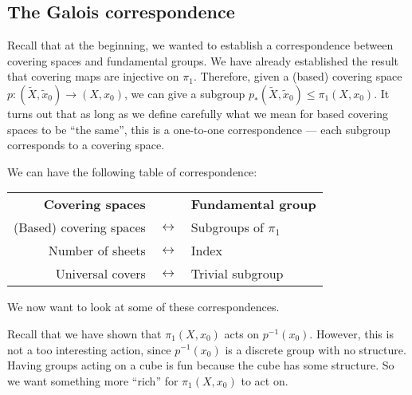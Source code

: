 \documentclass[a4paper]{article}
\begin{document}
\subsection{The Galois correspondence}
Recall that at the beginning, we wanted to establish a correspondence between covering spaces and fundamental groups. We have already established the result that covering maps are injective on $\pi_1$. Therefore, given a (based) covering space $p: (\tilde{X}, \tilde{x}_0) \to (X, x_0)$, we can give a subgroup $p_*(\tilde{X}, \tilde{x}_0)\leq \pi_1(X, x_0)$. It turns out that as long as we define carefully what we mean for based covering spaces to be ``the same'', this is a one-to-one correspondence --- each subgroup corresponds to a covering space.

We can have the following table of correspondence:
\begin{center}
  \begin{tabular}{rcl}
    \textbf{Covering spaces} & & \textbf{Fundamental group}\\
    (Based) covering spaces & $\longleftrightarrow$ & Subgroups of $\pi_1$\\
    Number of sheets & $\longleftrightarrow$ & Index\\
    Universal covers & $\longleftrightarrow$ & Trivial subgroup\\
  \end{tabular}
\end{center}
We now want to look at some of these correspondences.

Recall that we have shown that $\pi_1(X, x_0)$ acts on $p^{-1}(x_0)$. However, this is not a too interesting action, since $p^{-1}(x_0)$ is a discrete group with no structure. Having groups acting on a cube is fun because the cube has some structure. So we want something more ``rich'' for $\pi_1(X, x_0)$ to act on.
\end{document}
